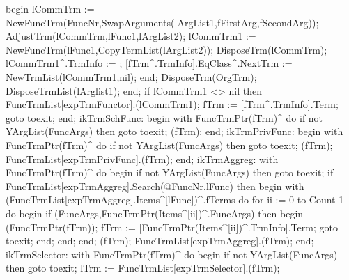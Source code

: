                   begin
                     lCommTrm := NewFuncTrm(FuncNr,SwapArguments(lArgList1,fFirstArg,fSecondArg));
                     AdjustTrm(lCommTrm,lFunc1,lArgList2);
                     lCommTrm1 := NewFuncTrm(lFunc1,CopyTermList(lArgList2));
                     DisposeTrm(lCommTrm);
                     lCommTrm1^.TrmInfo := ;
                     [fTrm^.TrmInfo].EqClass^.NextTrm := NewTrmList(lCommTrm1,nil);
                  end;
               DisposeTrm(OrgTrm);
               DisposeTrmList(lArglist1);
            end;
            if lCommTrm1 <> nil then FuncTrmList[expTrmFunctor].(lCommTrm1);
            fTrm := [fTrm^.TrmInfo].Term;
            goto toexit;
         end;
         ikTrmSchFunc:
            begin
               with FuncTrmPtr(fTrm)^ do
                  if not YArgList(FuncArgs) then goto toexit;
               (fTrm);
            end;
         ikTrmPrivFunc:
            begin
               with FuncTrmPtr(fTrm)^ do
                  if not YArgList(FuncArgs) then goto toexit;
               (fTrm);
               FuncTrmList[expTrmPrivFunc].(fTrm);
            end;
         ikTrmAggreg:
            with FuncTrmPtr(fTrm)^ do
         begin
            if not YArgList(FuncArgs) then goto toexit;
            if FuncTrmList[expTrmAggreg].Search(@FuncNr,lFunc) then
            begin
               with (FuncTrmList[expTrmAggreg].Items^[lFunc])^.fTerms do
                  for ii := 0 to Count-1 do
                  begin
                     if (FuncArgs,FuncTrmPtr(Items^[ii])^.FuncArgs) then
                     begin
                        (FuncTrmPtr(fTrm));
                        fTrm := [FuncTrmPtr(Items^[ii])^.TrmInfo].Term;
                        goto toexit;
                     end;
                  end;
            end;
            (fTrm);
            FuncTrmList[expTrmAggreg].(fTrm);
         end;
         ikTrmSelector:
            with FuncTrmPtr(fTrm)^ do
         begin
            if not YArgList(FuncArgs) then goto toexit;
            lTrm := FuncTrmList[expTrmSelector].(fTrm);
